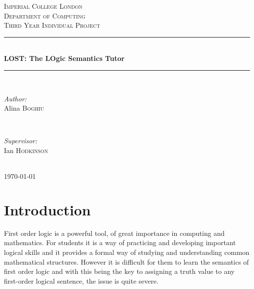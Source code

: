 \documentclass{article}
\begin{document}

\begin{titlepage}
\newcommand{\HRule}{\rule{\linewidth}{0.5mm}}
\center
\textsc{\LARGE Imperial College London}  \\[1.5cm]
\textsc{\Large Department of Computing}  \\[0.5cm]
\textsc{\large Third Year Individual Project} \\[0.5cm]

\HRule \\[0.6cm]
{\huge \bfseries LOST: The LOgic Semantics Tutor} \\[0.3cm]
\HRule \\[1.5cm]

\begin{minipage}{0.4\textwidth}

\begin{flushleft} \large \emph{Author:} \\
Alina  \textsc{Boghiu}
\end{flushleft}

\end{minipage}~
\begin{minipage}{0.4\textwidth}
\begin{flushright} \large \emph{Supervisor:} \\
Ian \textsc{Hodkinson}
\end{flushright}

\end{minipage}\\[4cm]

{\large \today}\\[3cm]
\vfill
\end{titlepage}


\section{Introduction}		%
First order logic is a powerful tool, of great importance in computing and mathematics. For students it is a way of practicing and developing important logical skills and it provides a formal way of studying and understanding common mathematical structures. However it is difficult for them to learn the semantics of first order logic and with this being the key to assigning a truth value to any first-order logical sentence, the issue is quite severe.\\
\end{document}
